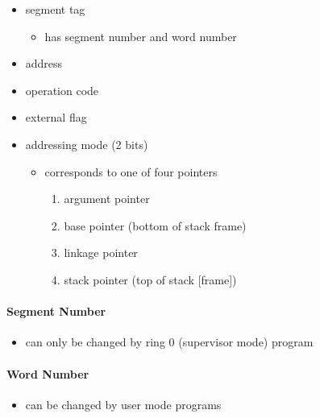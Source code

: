 \documentclass[
  12pt]{findlay}
\providecommand{\tightlist}{%
  \setlength{\itemsep}{0pt}\setlength{\parskip}{0pt}}
\begin{document}
\begin{itemize}
\tightlist
\item
  segment tag

  \begin{itemize}
  \tightlist
  \item
    has segment number and word number
  \end{itemize}
\item
  address
\item
  operation code
\item
  external flag
\item
  addressing mode (2 bits)

  \begin{itemize}
  \tightlist
  \item
    corresponds to one of four pointers

    \begin{enumerate}
    \def\labelenumi{(\arabic{enumi})}
    \tightlist
    \item
      argument pointer
    \item
      base pointer (bottom of stack frame)
    \item
      linkage pointer
    \item
      stack pointer (top of stack {[}frame{]})
    \end{enumerate}
  \end{itemize}
\end{itemize}

\hypertarget{segment-number}{%
\paragraph{Segment Number}\label{segment-number}}

\begin{itemize}
\tightlist
\item
  can only be changed by ring 0 (supervisor mode) program
\end{itemize}

\hypertarget{word-number}{%
\paragraph{Word Number}\label{word-number}}

\begin{itemize}
\tightlist
\item
  can be changed by user mode programs
\end{itemize}
\end{document}
